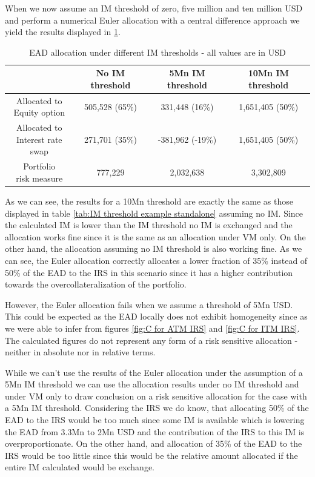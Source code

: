 \documentclass[../Thesis_AHoecherl.tex]{subfiles}
\begin{document}
    When we now assume an \gls{IM} threshold of zero, five million and ten million USD and perform a numerical Euler allocation with a central difference approach we yield the results displayed in \ref{tab:IM threshold example allocated}.
    \begin{table}[htbp]
        \centering
        \begin{tabular}{c||c|c|c}
            & No \gls{IM} threshold & 5Mn \gls{IM} threshold & 10Mn \gls{IM} threshold \\
            \toprule
            \makecell{Allocated to \\ Equity option} & 505,528 (65\%) & 331,448 (16\%) & 1,651,405 (50\%) \\
            \midrule
            \makecell{Allocated to \\ Interest rate swap}& 271,701 (35\%) & -381,962 (-19\%) & 1,651,405 (50\%) \\
            \bottomrule
            \makecell{Portfolio \\ risk measure} & 777,229 & 2,032,638 & 3,302,809 \\
        \end{tabular}%
        \caption[EAD allocation under different IM thresholds]{EAD allocation under different IM thresholds - all values are in USD}
        \label{tab:IM threshold example allocated}
    \end{table}
    As we can see, the results for a 10Mn threshold are exactly the same as those displayed in table \ref{tab:IM threshold example standalone} assuming no IM. Since the calculated \gls{IM} is lower than the \gls{IM} threshold no \gls{IM} is exchanged and the allocation works fine since it is the same as an allocation under \gls{VM} only.
    On the other hand, the allocation assuming no \gls{IM} threshold is also working fine. As we can see, the Euler allocation correctly allocates a lower fraction of 35\% instead of 50\% of the \gls{EAD} to the \gls{IRS} in this scenario since it has a higher contribution towards the overcollateralization of the portfolio.

    However, the Euler allocation fails when we assume a threshold of 5Mn USD. This could be expected as the \gls{EAD} locally does not exhibit homogeneity since as we were able to infer from figures \ref{fig:C for ATM IRS} and \ref{fig:C for ITM IRS}. The calculated figures do not represent any form of a risk sensitive allocation - neither in absolute nor in relative terms.

    While we can't use the results of the Euler allocation under the assumption of a 5Mn \gls{IM} threshold we can use the allocation results under no \gls{IM} threshold and under \gls{VM} only to draw conclusion on a risk sensitive allocation for the case with a 5Mn \gls{IM} threshold.
    Considering the \gls{IRS} we do know, that allocating 50\% of the \gls{EAD} to the \gls{IRS} would be too much since some \gls{IM} is available which is lowering the \gls{EAD} from 3.3Mn to 2Mn USD and the contribution of the \gls{IRS} to this \gls{IM} is overproportionate. On the other hand, and allocation of 35\% of the \gls{EAD} to the \gls{IRS} would be too little since this would be the relative amount allocated if the entire \gls{IM} calculated would be exchange.
    
\end{document}
